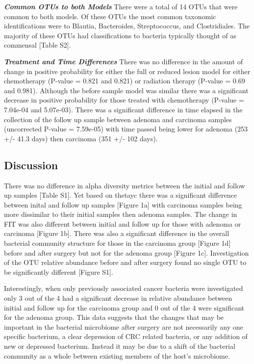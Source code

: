 \documentclass[12pt,]{article}
\begin{document}
\textbf{\emph{Common OTUs to both Models}} There were a total of 14 OTUs
that were common to both models. Of these OTUs the most common taxonomic
identifications were to Blautia, Bacteroides, Streptococcus, and
Clostridiales. The majority of these OTUs had classifications to
bacteria typically thought of as commensal {[}Table S2{]}.

\textbf{\emph{Treatment and Time Differences}} There was no difference
in the amount of change in positive probability for either the full or
reduced lesion model for either chemotherapy (P-value = 0.821 and 0.821)
or radiation therapy (P-value = 0.69 and 0.981). Although the before
sample model was similar there was a significant decrease in positive
probability for those treated with chemotherapy (P-value = 7.04e-04 and
5.07e-03). There was a significant difference in time elapsed in the
collection of the follow up sample between adenoma and carcinoma samples
(uncorrected P-value = 7.59e-05) with time passed being lower for
adenoma (253 +/- 41.3 days) then carcinoma (351 +/- 102 days).

\newpage

\subsection{Discussion}\label{discussion}

There was no difference in alpha diversity metrics between the initial
and follow up samples {[}Table S1{]}. Yet based on thetayc there was a
significant difference between inital and follow up samples {[}Figure
1a{]} with carcinoma samples being more dissimilar to their initial
samples then adenoma samples. The change in FIT was also different
between initial and follow up for those with adenoma or carcinoma
{[}Figure 1b{]}. There was also a significant difference in the overall
bacterial community structure for those in the carcinoma group {[}Figure
1d{]} before and after surgery but not for the adenoma group {[}Figure
1c{]}. Investigation of the OTU relative abundance before and after
surgery found no single OTU to be significantly different {[}Figure
S1{]}.

Interestingly, when only previously associated cancer bacteria were
investigated only 3 out of the 4 had a significant decrease in relative
abundance between initial and follow up for the carcinoma group and 0
out of the 4 were significant for the adenoma group. This data suggests
that the changes that may be important in the bacterial microbiome after
surgery are not necessarily any one specific bacterium, a clear
depression of CRC related bacteria, or any addition of new or depressed
bacterium. Instead it may be due to a shift of the bacterial community
as a whole between existing members of the host's microbiome.
\end{document}
